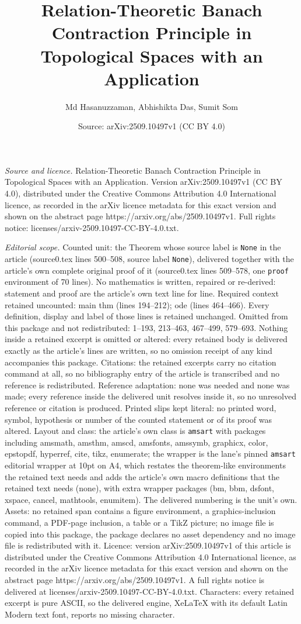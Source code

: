 \documentclass[10pt,a4paper]{amsart}
\title[Relation-Theoretic Banach Contraction Principle in Topologic]{Relation-Theoretic Banach Contraction Principle in Topological Spaces with an Application}
\author{Md Hasanuzzaman, Abhishikta Das, Sumit Som}
\date{Source: arXiv:2509.10497v1 (CC BY 4.0)}
\begin{document}
\maketitle

\noindent\emph{Source and licence.} Relation-Theoretic Banach Contraction Principle in Topological Spaces with an Application. Version arXiv:2509.10497v1 (CC BY 4.0), distributed under the Creative Commons Attribution 4.0 International licence, as recorded in the arXiv licence metadata for this exact version and shown on the abstract page https://arxiv.org/abs/2509.10497v1. Full rights notice: licenses/arxiv-2509.10497-CC-BY-4.0.txt.\par\smallskip

\noindent\textit{Editorial scope.} Counted unit: the Theorem whose source label is \texttt{None} in the article (source0.tex lines 500--508, source label \texttt{None}), delivered together with the article's own complete original proof of it (source0.tex lines 509--578, one \texttt{proof} environment of 70 lines). No mathematics is written, repaired or re-derived: statement and proof are the article's own text line for line. Required context retained uncounted: main thm (lines 194--212); ode (lines 464--466). Every definition, display and label of those lines is retained unchanged. Omitted from this package and not redistributed: 1--193, 213--463, 467--499, 579--693. Nothing inside a retained excerpt is omitted or altered: every retained body is delivered exactly as the article's lines are written, so no omission receipt of any kind accompanies this package. Citations: the retained excerpts carry no citation command at all, so no bibliography entry of the article is transcribed and no reference is redistributed. Reference adaptation: none was needed and none was made; every reference inside the delivered unit resolves inside it, so no unresolved reference or citation is produced. Printed slips kept literal: no printed word, symbol, hypothesis or number of the counted statement or of its proof was altered. Layout and class: the article's own class is \texttt{amsart} with packages including amsmath, amsthm, amscd, amsfonts, amssymb, graphicx, color, epstopdf, hyperref, cite, tikz, enumerate; the wrapper is the lane's pinned \texttt{amsart} editorial wrapper at 10pt on A4, which restates the theorem-like environments the retained text needs and adds the article's own macro definitions that the retained text needs (none), with extra wrapper packages (bm, bbm, dsfont, xspace, cancel, mathtools, enumitem). The delivered numbering is the unit's own. Assets: no retained span contains a figure environment, a graphics-inclusion command, a PDF-page inclusion, a table or a TikZ picture; no image file is copied into this package, the package declares no asset dependency and no image file is redistributed with it. Licence: version arXiv:2509.10497v1 of this article is distributed under the Creative Commons Attribution 4.0 International licence, as recorded in the arXiv licence metadata for this exact version and shown on the abstract page https://arxiv.org/abs/2509.10497v1. A full rights notice is delivered at licenses/arxiv-2509.10497-CC-BY-4.0.txt. Characters: every retained excerpt is pure ASCII, so the delivered engine, XeLaTeX with its default Latin Modern text font, reports no missing character.
\end{document}

